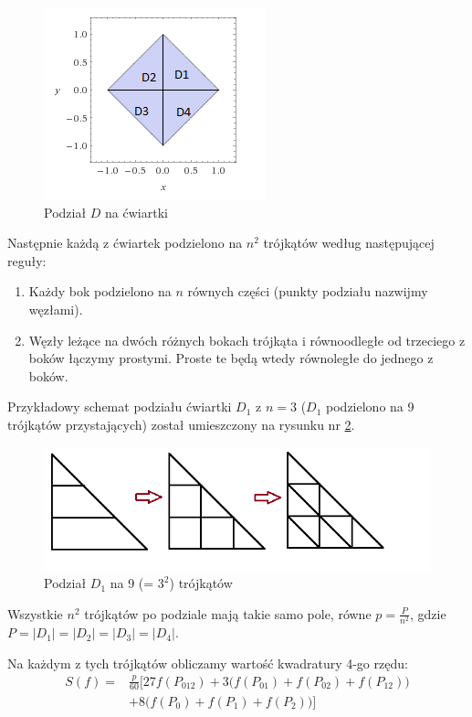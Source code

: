 \documentclass[12pt]{article}
\begin{document}
	\begin{figure}[H]
		\centering
		\includegraphics[scale=1.5]{images/D-quarters.png}
		\caption{Podział $D$ na ćwiartki}
		\label{D-quarters}
	\end{figure}

	Następnie każdą z ćwiartek podzielono na $n^2$ trójkątów według następującej reguły:
	\begin{enumerate}
		\item Każdy bok podzielono na $n$ równych części (punkty podziału nazwijmy węzłami).
		\item Węzły leżące na dwóch różnych bokach trójkąta i równoodległe od trzeciego z boków łączymy prostymi. Proste te będą wtedy równoległe do jednego z boków.
	\end{enumerate}

	Przykładowy schemat podziału ćwiartki $D_1$ z $n = 3$ ($D_1$ podzielono na 9 trójkątów przystających) został umieszczony na rysunku nr \ref{triangle-division}.
	
	\begin{figure}[H]
		\centering
		\includegraphics[]{images/triangle-division.png}
		\caption{Podział $D_1$ na 9 (= $3^2$) trójkątów}
		\label{triangle-division}
	\end{figure}

	Wszystkie $n^2$ trójkątów po podziale mają takie samo pole, równe $p = \frac{P}{n^2}$, gdzie $P = |D_1| = |D_2| = |D_3| = |D_4|$.
	
	Na każdym z tych trójkątów obliczamy wartość kwadratury 4-go rzędu:
	\begin{align}
		S(f) = & \frac{p}{60} \Bigg[  27f(P_{012}) + 3 \Big( f(P_{01}) + f(P_{02}) + f(P_{12}) \Big)  \nonumber \\
		       & + 8\Big( f(P_0) + f(P_1) + f(P_2) \Big) \Bigg] \label{kwadratura}
	\end{align}
	
\end{document}
